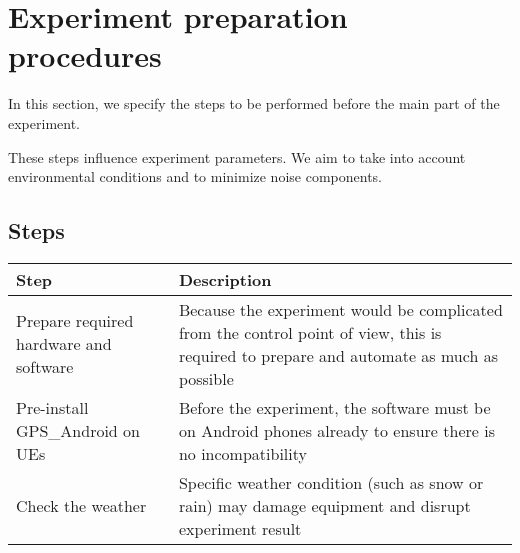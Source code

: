\section{Experiment preparation procedures}\label{experiment-preparation-procedures}

In this section, we specify the steps to be performed before the main
part of the experiment.

These steps influence experiment parameters. We aim to take into account
environmental conditions and to minimize noise components.

\subsection{Steps}\label{steps}

\begin{longtable}[]{@{}ll@{}}
\toprule
\begin{minipage}[b]{0.27\columnwidth}\raggedright
Step\strut
\end{minipage} & \begin{minipage}[b]{0.67\columnwidth}\raggedright
Description\strut
\end{minipage}\tabularnewline
\midrule
\endhead
\begin{minipage}[t]{0.27\columnwidth}\raggedright
Prepare required hardware and software\strut
\end{minipage} & \begin{minipage}[t]{0.67\columnwidth}\raggedright
Because the experiment would be complicated from the control point of
view, this is required to prepare and automate as much as possible\strut
\end{minipage}\tabularnewline
\begin{minipage}[t]{0.27\columnwidth}\raggedright
Pre-install GPS\_Android on UEs\strut
\end{minipage} & \begin{minipage}[t]{0.67\columnwidth}\raggedright
Before the experiment, the software must be on Android phones already to
ensure there is no incompatibility\strut
\end{minipage}\tabularnewline
\begin{minipage}[t]{0.27\columnwidth}\raggedright
Check the weather\strut
\end{minipage} & \begin{minipage}[t]{0.67\columnwidth}\raggedright
Specific weather condition (such as snow or rain) may damage equipment
and disrupt experiment result\strut
\end{minipage}\tabularnewline

\end{longtable}
